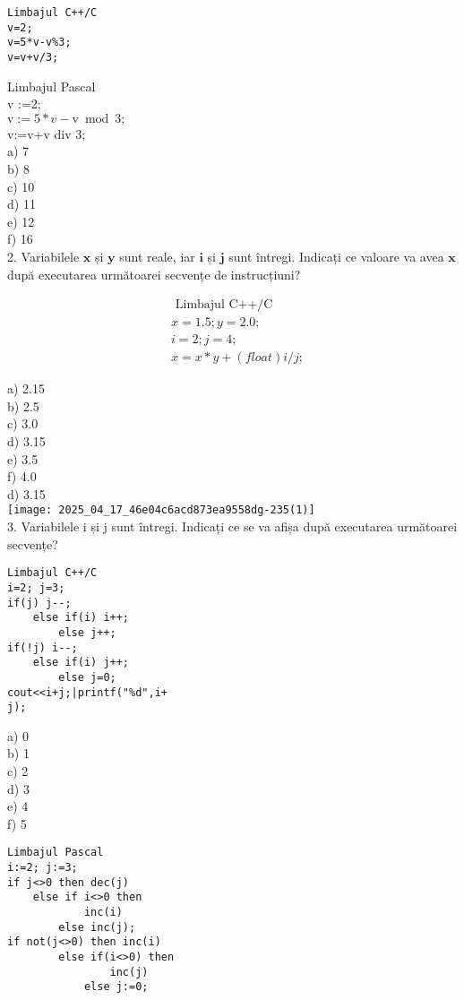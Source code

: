 \begin{verbatim}
Limbajul C++/C
v=2;
v=5*v-v%3;
v=v+v/3;
\end{verbatim}

Limbajul Pascal\\
v :=2;\\
$\mathrm{v}:=5 * v-\mathrm{v} \bmod 3 ;$\\
v:=v+v div 3;\\
a) 7\\
b) 8\\
c) 10\\
d) 11\\
e) 12\\
f) 16\\
2. Variabilele $\mathbf{x}$ și $\mathbf{y}$ sunt reale, iar $\mathbf{i}$ și $\mathbf{j}$ sunt întregi. Indicați ce valoare va avea $\mathbf{x}$ după executarea următoarei secvențe de instrucțiuni?

$$
\begin{aligned}
& \text { Limbajul C++/C } \\
& x=1.5 ; y=2.0 ; \\
& i=2 ; j=4 ; \\
& x=x * y+(f l o a t) i / j ;
\end{aligned}
$$

a) 2.15\\
b) 2.5\\
c) 3.0\\
d) 3.15\\
e) 3.5\\
f) 4.0\\
d) 3.15\\
\texttt{[image: 2025\_04\_17\_46e04c6acd873ea9558dg-235(1)]}\\
3. Variabilele i și j sunt întregi. Indicați ce se va afișa după executarea următoarei secvențe?

\begin{verbatim}
Limbajul C++/C
i=2; j=3;
if(j) j--;
    else if(i) i++;
        else j++;
if(!j) i--;
    else if(i) j++;
        else j=0;
cout<<i+j;|printf("%d",i+
j);
\end{verbatim}

a) 0\\
b) 1\\
c) 2\\
d) 3\\
e) 4\\
f) 5

\begin{verbatim}
Limbajul Pascal
i:=2; j:=3;
if j<>0 then dec(j)
    else if i<>0 then
            inc(i)
        else inc(j);
if not(j<>0) then inc(i)
        else if(i<>0) then
                inc(j)
            else j:=0;
\end{verbatim}

